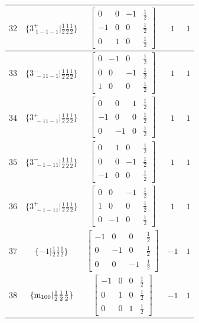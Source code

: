 \documentclass[fleqn,8pt]{jsarticle}
\begin{document}
\begin{longtable}{ccccc}
$ 32 $ & $ \{3^{+}_{\,\,1-1-1}|\frac{1}{2} \frac{1}{2} \frac{1}{2}\} $ & $ \begin{bmatrix} 0 & 0 & -1 & \frac{1}{2} \\ -1 & 0 & 0 & \frac{1}{2} \\ 0 & 1 & 0 & \frac{1}{2} \end{bmatrix} $ & $ 1 $ & $ 1 $ \\ \hline
$ 33 $ & $ \{3^{-}_{\,\,-11-1}|\frac{1}{2} \frac{1}{2} \frac{1}{2}\} $ & $ \begin{bmatrix} 0 & -1 & 0 & \frac{1}{2} \\ 0 & 0 & -1 & \frac{1}{2} \\ 1 & 0 & 0 & \frac{1}{2} \end{bmatrix} $ & $ 1 $ & $ 1 $ \\ \hline
$ 34 $ & $ \{3^{+}_{\,\,-11-1}|\frac{1}{2} \frac{1}{2} \frac{1}{2}\} $ & $ \begin{bmatrix} 0 & 0 & 1 & \frac{1}{2} \\ -1 & 0 & 0 & \frac{1}{2} \\ 0 & -1 & 0 & \frac{1}{2} \end{bmatrix} $ & $ 1 $ & $ 1 $ \\ \hline
$ 35 $ & $ \{3^{-}_{\,\,-1-11}|\frac{1}{2} \frac{1}{2} \frac{1}{2}\} $ & $ \begin{bmatrix} 0 & 1 & 0 & \frac{1}{2} \\ 0 & 0 & -1 & \frac{1}{2} \\ -1 & 0 & 0 & \frac{1}{2} \end{bmatrix} $ & $ 1 $ & $ 1 $ \\ \hline
$ 36 $ & $ \{3^{+}_{\,\,-1-11}|\frac{1}{2} \frac{1}{2} \frac{1}{2}\} $ & $ \begin{bmatrix} 0 & 0 & -1 & \frac{1}{2} \\ 1 & 0 & 0 & \frac{1}{2} \\ 0 & -1 & 0 & \frac{1}{2} \end{bmatrix} $ & $ 1 $ & $ 1 $ \\ \hline
$ 37 $ & $ \{-1|\frac{1}{2} \frac{1}{2} \frac{1}{2}\} $ & $ \begin{bmatrix} -1 & 0 & 0 & \frac{1}{2} \\ 0 & -1 & 0 & \frac{1}{2} \\ 0 & 0 & -1 & \frac{1}{2} \end{bmatrix} $ & $ -1 $ & $ 1 $ \\ \hline
$ 38 $ & $ \{{\rm m}_{100}|\frac{1}{2} \frac{1}{2} \frac{1}{2}\} $ & $ \begin{bmatrix} -1 & 0 & 0 & \frac{1}{2} \\ 0 & 1 & 0 & \frac{1}{2} \\ 0 & 0 & 1 & \frac{1}{2} \end{bmatrix} $ & $ -1 $ & $ 1 $ \\ \hline

\end{longtable}
\end{document}

